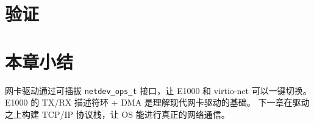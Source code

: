 
\section{验证}
\label{sec:nic-verify}


\section{本章小结}

网卡驱动通过可插拔 \texttt{netdev\_ops\_t} 接口，让 E1000 和 virtio-net 可以一键切换。
E1000 的 TX/RX 描述符环 + DMA 是理解现代网卡驱动的基础。
下一章在驱动之上构建 TCP/IP 协议栈，让 OS 能进行真正的网络通信。
